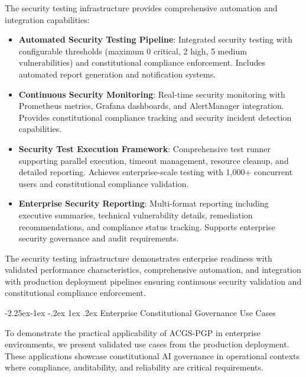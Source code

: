 \documentclass[manuscript,screen,9pt]{acmart}
\makeatletter
\renewcommand\subsection{\@startsection{subsection}{2}{\z@}%
  {-2.25ex\@plus -1ex \@minus -.2ex}%
  {1ex \@plus .2ex}%
  {\normalfont\large\bfseries}}
\makeatother
\begin{document}
The security testing infrastructure provides comprehensive automation and integration capabilities:

\begin{itemize}[leftmargin=*,itemsep=2pt,parsep=1pt]
    \item \textbf{Automated Security Testing Pipeline}: Integrated security testing with configurable thresholds (maximum 0 critical, 2 high, 5 medium vulnerabilities) and constitutional compliance enforcement. Includes automated report generation and notification systems.

    \item \textbf{Continuous Security Monitoring}: Real-time security monitoring with Prometheus metrics, Grafana dashboards, and AlertManager integration. Provides constitutional compliance tracking and security incident detection capabilities.

    \item \textbf{Security Test Execution Framework}: Comprehensive test runner supporting parallel execution, timeout management, resource cleanup, and detailed reporting. Achieves enterprise-scale testing with 1,000+ concurrent users and constitutional compliance validation.

    \item \textbf{Enterprise Security Reporting}: Multi-format reporting including executive summaries, technical vulnerability details, remediation recommendations, and compliance status tracking. Supports enterprise security governance and audit requirements.
\end{itemize}

The security testing infrastructure demonstrates enterprise readiness with validated performance characteristics, comprehensive automation, and integration with production deployment pipelines ensuring continuous security validation and constitutional compliance enforcement.

\subsection{Enterprise Constitutional Governance Use Cases}
\label{subsec:enterprise_use_cases}

To demonstrate the practical applicability of ACGS-PGP in enterprise environments, we present validated use cases from the production deployment. These applications showcase constitutional AI governance in operational contexts where compliance, auditability, and reliability are critical requirements.
\end{document}
